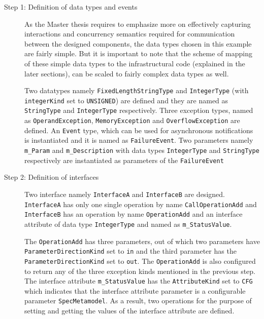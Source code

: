 \begin{description}
\item [Step 1: Definition of data types and events] As the Master thesis requires to emphasize more on effectively capturing interactions and concurrency semantics required for communication between the designed components, the data types chosen in this example are fairly simple. But it is important to note that the scheme of mapping of these simple data types to the infrastructural code (explained in the later sections), can be scaled to fairly complex data types as well.

Two datatypes namely \texttt{Fixed\allowbreak Length\allowbreak String\allowbreak Type} and \texttt{IntegerType} (with \texttt{integerKind} set to \texttt{UNSIGNED}) are defined and they are named as \texttt{StringType} and \texttt{IntegerType} respectively. Three exception types, named as \texttt{OperandException}, \texttt{MemoryException} and \texttt{Overflow\allowbreak Exception} are defined. An \texttt{Event} type, which can be used for asynchronous notifications \cite{SpecMetamodel} is instantiated and it is named as \texttt{FailureEvent}. Two parameters namely \texttt{m\_Param} and \texttt{m\_Description} with data types \texttt{IntegerType} and \texttt{StringType} respectively are instantiated as parameters of the \texttt{FailureEvent}

\item [Step 2: Definition of interfaces] Two interface namely \texttt{InterfaceA} and \texttt{InterfaceB} are designed. \texttt{InterfaceA} has only one single operation by name \texttt{CallOperationAdd} and \texttt{InterfaceB} has an operation by name \texttt{OperationAdd} and an interface attribute of data type \texttt{IntegerType} and named as \texttt{m\_StatusValue}.

The \texttt{OperationAdd} has three parameters, out of which two parameters have \texttt{Parameter\allowbreak Direction\allowbreak Kind} set to \texttt{in} and the third parameter has the \texttt{Parameter\allowbreak Direction\allowbreak Kind} set to \texttt{out}. The \texttt{OperationAdd} is also configured to return any of the three exception kinds mentioned in the previous step. The interface attribute \texttt{m\_StatusValue} has the \texttt{AttributeKind} set to \texttt{CFG} which indicates that the interface attribute parameter is a configurable parameter \texttt{SpecMetamodel}. As a result, two operations for the purpose of setting and getting the values of the interface attribute are defined.   


\end{description}
